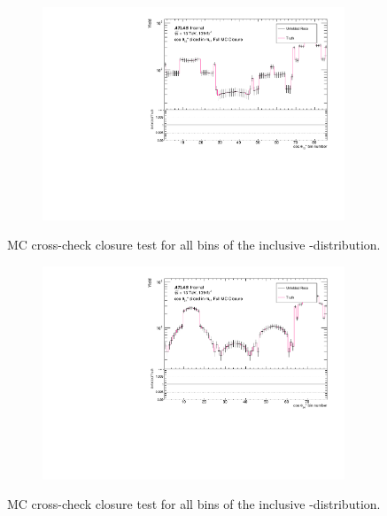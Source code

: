 \begin{figure}[htb]
  \centering
  \begin{subfigure}{.65\textwidth}\centering\includegraphics[width = 0.99\textwidth]{Figures/m4l/UnfoldingStudies/v014_closure/FullMCClosure_cosThetaStar1_m4l.pdf}\end{subfigure}
\caption{MC cross-check closure test for all bins of the inclusive \costhetastar-\mFourL distribution.}
 \end{figure}

\begin{figure}[htb]
  \centering
  \begin{subfigure}{.65\textwidth}\centering\includegraphics[width = 0.99\textwidth]{Figures/m4l/UnfoldingStudies/v014_closure/FullMCClosure_cosThetaStar3_m4l.pdf}\end{subfigure}
\caption{MC cross-check closure test for all bins of the inclusive \costhetastar-\mFourL distribution.}
 \end{figure}

